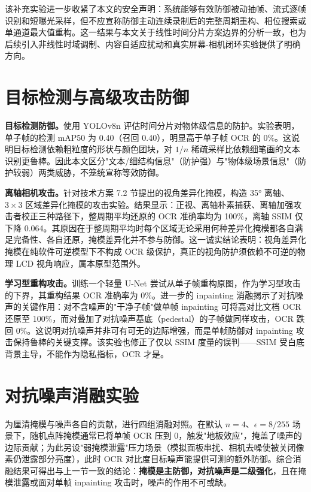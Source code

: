 该补充实验进一步收紧了本文的安全声明：系统能够有效防御被动抽帧、流式逐帧识别和短曝光采样，但不应宣称防御主动连续录制后的完整周期重构、相位搜索或单通道最大值重构。这一结果与本文关于线性时间分片方案边界的分析一致，也为后续引入非线性时域调制、内容自适应扰动和真实屏幕-相机闭环实验提供了明确方向。

\section{目标检测与高级攻击防御}

\textbf{目标检测防御。}使用 YOLOv8n 评估时间分片对物体级信息的防护。实验表明，单子帧的检测 mAP50 为 0.40（召回 0.40），明显高于单子帧 OCR 的 0\%。这说明目标检测依赖粗粒度的形状与颜色团块，对 $1/n$ 稀疏采样比依赖细笔画的文本识别更鲁棒。因此本文区分"文本/细结构信息"（防护强）与"物体级场景信息"（防护较弱）两类威胁，不笼统宣称等效防御。

\textbf{离轴相机攻击。}针对技术方案 7.2 节提出的视角差异化掩模，构造 35° 离轴、$3\times3$ 区域差异化掩模的攻击实验。结果显示：正视、离轴朴素捕获、离轴加强攻击者校正三种路径下，整周期平均还原的 OCR 准确率均为 100\%，离轴 SSIM 仅下降 0.064。其原因在于整周期平均时每个区域无论采用何种差异化掩模都各自满足完备性、各自还原，掩模差异化并不参与防御。这一诚实结论表明：视角差异化掩模在纯软件可逆模型下不构成 OCR 级保护，真正的视角防护须依赖不可逆的物理 LCD 视角响应，属本原型范围外。

\textbf{学习型重构攻击。}训练一个轻量 U-Net 尝试从单子帧重构原图，作为学习型攻击的下界，其重构结果 OCR 准确率为 0\%。进一步的 inpainting 消融揭示了对抗噪声的关键作用：对不含噪声的"干净子帧"做单帧 inpainting 可将高对比文档 OCR 还原至 100\%，而对叠加了对抗噪声基底（pedestal）的子帧做同样攻击，OCR 跌回 0\%。这说明对抗噪声并非可有可无的边际增强，而是单帧防御对 inpainting 攻击保持鲁棒的关键支撑。该实验也修正了仅以 SSIM 度量的误判——SSIM 受白底背景主导，不能作为隐私指标，OCR 才是。

\section{对抗噪声消融实验}

为厘清掩模与噪声各自的贡献，进行四组消融对照。在默认 $n=4$、$\epsilon=8/255$ 场景下，随机点阵掩模通常已将单帧 OCR 压到 0，触发"地板效应"，掩盖了噪声的边际贡献；为此另设"弱掩模泄露"压力场景（模拟面板串扰、相机去噪使被关闭像素仍泄露部分亮度），此时 OCR 对比度目标噪声能提供可测的额外防御。综合消融结果可得出与上一节一致的结论：\textbf{掩模是主防御，对抗噪声是二级强化}，且在掩模泄露或面对单帧 inpainting 攻击时，噪声的作用不可或缺。

